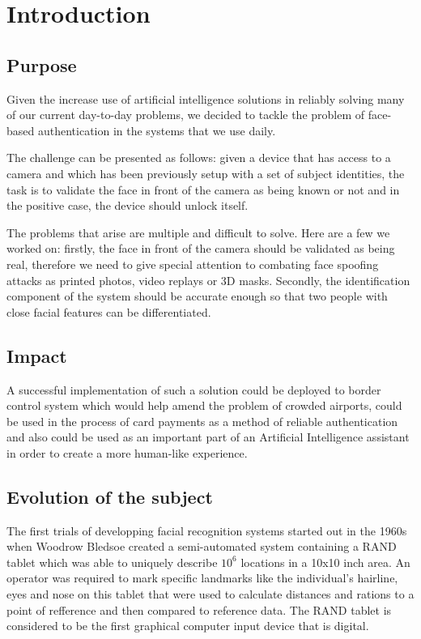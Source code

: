 \chapter{Introduction}

\section{Purpose}

Given the increase use of artificial intelligence solutions in reliably solving many of our current day-to-day problems, we decided to tackle the problem of face-based authentication in the systems that we use daily.

The challenge can be presented as follows: given a device that has access to a camera and which has been previously setup with a set of subject identities, the task is to validate the face in front of the camera as being known or not and in the positive case, the device should unlock itself.

The problems that arise are multiple and difficult to solve. Here are a few we worked on: firstly, the face in front of the camera should be validated as being real, therefore we need to give special attention to combating face spoofing attacks as printed photos, video replays or 3D masks. Secondly, the identification component of the system should be accurate enough so that two people with close facial features can be differentiated.

\section{Impact}
A successful implementation of such a solution could be deployed to border control system which would help amend the problem of crowded airports, could be used in the process of card payments as a method of reliable authentication and also could be used as an important part of an Artificial Intelligence assistant in order to create a more human-like experience.

\section{Evolution of the subject}
The first trials of developping facial recognition systems started out in the 1960s when Woodrow Bledsoe created a semi-automated system \cite{Davis:1964:RTM:1464052.1464080} containing a RAND tablet which was able to uniquely describe $10^{6}$ locations in a 10x10 inch area.
An operator was required to mark specific landmarks like the individual's  hairline, eyes and nose on this tablet that were used to calculate distances and rations to a point of refference and then compared to reference data. The RAND tablet is considered to be the first graphical computer input device that is digital.

